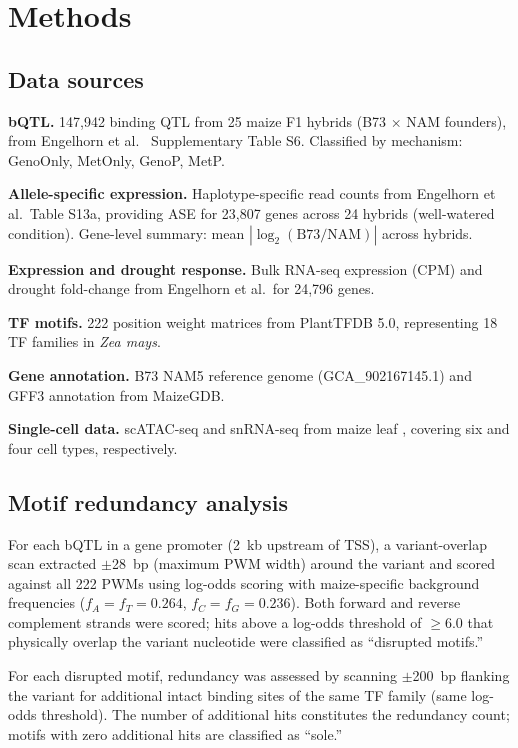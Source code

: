 \documentclass[11pt,a4paper]{article}
\begin{document}
\section{Methods}

\subsection{Data sources}

\textbf{bQTL.} 147,942 binding QTL from 25 maize F1 hybrids (B73 $\times$ NAM founders), from Engelhorn et al.\ \citep{engelhorn2025} Supplementary Table S6. Classified by mechanism: GenoOnly, MetOnly, GenoP, MetP.

\textbf{Allele-specific expression.} Haplotype-specific read counts from Engelhorn et al.\ Table S13a, providing ASE for 23,807 genes across 24 hybrids (well-watered condition). Gene-level summary: mean $|\log_2(\text{B73/NAM})|$ across hybrids.

\textbf{Expression and drought response.} Bulk RNA-seq expression (CPM) and drought fold-change from Engelhorn et al.\ for 24,796 genes.

\textbf{TF motifs.} 222 position weight matrices from PlantTFDB 5.0, representing 18 TF families in \textit{Zea mays}.

\textbf{Gene annotation.} B73 NAM5 reference genome (GCA\_902167145.1) and GFF3 annotation from MaizeGDB.

\textbf{Single-cell data.} scATAC-seq and snRNA-seq from maize leaf \citep{marand2021}, covering six and four cell types, respectively.

\subsection{Motif redundancy analysis}

For each bQTL in a gene promoter (2~kb upstream of TSS), a variant-overlap scan extracted $\pm$28~bp (maximum PWM width) around the variant and scored against all 222 PWMs using log-odds scoring with maize-specific background frequencies ($f_A = f_T = 0.264$, $f_C = f_G = 0.236$). Both forward and reverse complement strands were scored; hits above a log-odds threshold of $\geq$6.0 that physically overlap the variant nucleotide were classified as ``disrupted motifs.''

For each disrupted motif, redundancy was assessed by scanning $\pm$200~bp flanking the variant for additional intact binding sites of the same TF family (same log-odds threshold). The number of additional hits constitutes the redundancy count; motifs with zero additional hits are classified as ``sole.''
\end{document}
